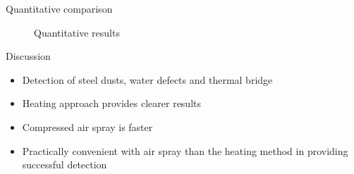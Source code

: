 \begin{frame}{Quantitative comparison}

    \begin{figure}
        \hspace*{-20pt}
        \caption{Quantitative results}

    \end{figure}
\end{frame}


\begin{frame}{Discussion}
    \begin{itemize}[<+->]
    \pause
    \large
        \item Detection of steel dusts, water defects and thermal bridge 
        \item Heating approach provides clearer results
        \item Compressed air spray is faster  
        \item Practically convenient with air spray than the heating method in providing successful detection
    \end{itemize}
\end{frame}
